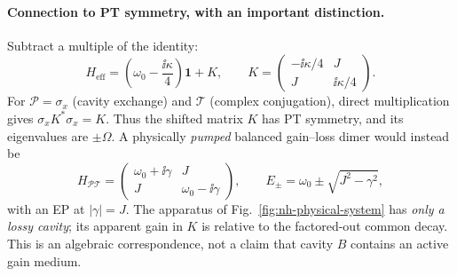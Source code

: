 \paragraph{Connection to PT symmetry, with an important distinction.}
Subtract a multiple of the identity:
\begin{equation}
H_{\mathrm{eff}}=
\left(\omega_0-\frac{\ii\kappa}{4}\right)\mathbf1+
K,\qquad
K=\begin{pmatrix}-\ii\kappa/4&J\\J&\ii\kappa/4\end{pmatrix}.
\label{eq:nh-traceless}
\end{equation}
For $\mathcal P=\sigma_x$ (cavity exchange) and $\mathcal T$
(complex conjugation), direct multiplication gives
$\sigma_x K^*\sigma_x=K$. Thus the shifted matrix $K$
has PT symmetry, and its eigenvalues are $\pm\Omega$.
A physically \emph{pumped} balanced gain--loss dimer would
instead be
\begin{equation}
H_{\mathcal{PT}}=
\begin{pmatrix}\omega_0+\ii\gamma&J\\
J&\omega_0-\ii\gamma\end{pmatrix},
\qquad E_\pm=\omega_0\pm\sqrt{J^2-\gamma^2},
\end{equation}
with an EP at $|\gamma|=J$.
The apparatus of Fig.~\ref{fig:nh-physical-system} has
\emph{only a lossy cavity}; its apparent gain in $K$ is
relative to the factored-out common decay. This is an
algebraic correspondence, not a claim that cavity $B$
contains an active gain medium.

